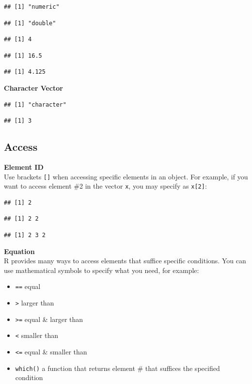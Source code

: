 \documentclass[
]{book}
\providecommand{\tightlist}{%
  \setlength{\itemsep}{0pt}\setlength{\parskip}{0pt}}
\begin{document}
\begin{verbatim}
## [1] "numeric"
\end{verbatim}

\begin{verbatim}
## [1] "double"
\end{verbatim}

\begin{verbatim}
## [1] 4
\end{verbatim}

\begin{verbatim}
## [1] 16.5
\end{verbatim}

\begin{verbatim}
## [1] 4.125
\end{verbatim}

\textbf{Character Vector}

\begin{verbatim}
## [1] "character"
\end{verbatim}

\begin{verbatim}
## [1] 3
\end{verbatim}

\hypertarget{access}{%
\subsection{Access}\label{access}}

\textbf{Element ID}\\
Use brackets \texttt{{[}{]}} when accessing specific elements in an object. For example, if you want to access element \#2 in the vector \texttt{x}, you may specify as \texttt{x{[}2{]}}:

\begin{verbatim}
## [1] 2
\end{verbatim}

\begin{verbatim}
## [1] 2 2
\end{verbatim}

\begin{verbatim}
## [1] 2 3 2
\end{verbatim}

\textbf{Equation}\\
R provides many ways to access elements that suffice specific conditions. You can use mathematical symbols to specify what you need, for example:

\begin{itemize}
\tightlist
\item
  \texttt{==} equal
\item
  \texttt{\textgreater{}} larger than
\item
  \texttt{\textgreater{}=} equal \& larger than
\item
  \texttt{\textless{}} smaller than
\item
  \texttt{\textless{}=} equal \& smaller than
\item
  \texttt{which()} a function that returns element \# that suffices the specified condition
\end{itemize}
\end{document}
